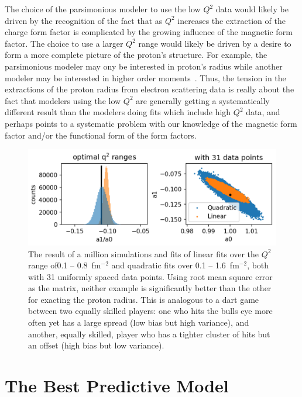 \documentclass[10pt,aps,prc,twocolumn]{revtex4-1}
\begin{document}
The choice of the parsimonious modeler to use the low $Q^2$ data would likely be 
driven by the recognition of the fact that as $Q^2$ increases
the extraction of the charge form factor is complicated by the growing influence of the magnetic 
form factor.   The choice to use a larger $Q^2$ range would likely be driven by a desire 
to form a more complete picture of the proton's structure.
For example, the parsimonious modeler may ony be interested in proton's radius while another 
modeler may be interested in higher order moments~\cite{Alarcon:2017lhg}.
Thus, the tension in the extractions of the proton radius from electron scattering data is really 
about the fact that modelers using the low $Q^2$ are generally getting a systematically different 
result than the modelers doing fits which include high $Q^2$ data, and perhaps points to a systematic 
problem with our knowledge of the magnetic form factor and/or the functional form of the
form factors.

\begin{figure}
\includegraphics[width=\columnwidth]{Figure/zoptimized.png}
\caption{The result of a million simulations and fits of linear fits over the $Q^2$ range 
of0.1 -- 0.8~fm$^{-2}$ and quadratic fits over 0.1 -- 1.6~fm$^{-2}$, both with 31 uniformly spaced data points.    Using root mean
square error as the matrix, neither example is significantly better than the other for exacting the proton
radius.   This is analogous to a dart game between two equally skilled players: one who hits the bulls eye more 
often yet has a large spread (low bias but high variance), and another, equally skilled, player who has a 
tighter cluster of hits but an offset (high bias but low variance).}
\label{zoptimized}
\end{figure}

\section{The Best Predictive Model}
\end{document}
